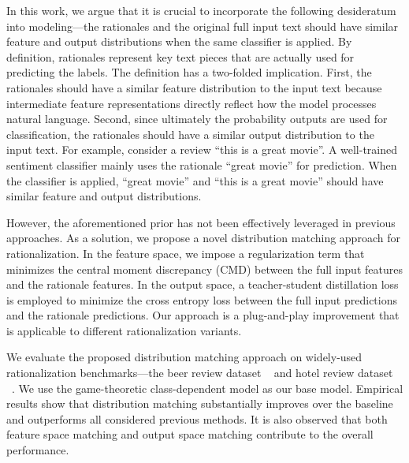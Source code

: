 \documentclass[letterpaper]{article} %
\begin{document}
In this work, we argue that it is crucial to incorporate the following desideratum into modeling---the rationales and the original full input text should have similar feature and output distributions when the same classifier is applied. By definition, rationales represent key text pieces that are actually used for predicting the labels. The definition has a two-folded implication. First, the rationales should have a similar feature distribution to the input text because intermediate feature representations directly reflect how the model processes natural language. Second, since ultimately the probability outputs are used for classification, the rationales should have a similar output distribution to the input text. For example, consider a review ``this is a great movie''. A well-trained sentiment classifier mainly uses the rationale ``great movie'' for prediction. When the classifier is applied, ``great movie'' and ``this is a great movie'' should have similar feature and output distributions.

However, the aforementioned prior has not been effectively leveraged in previous approaches. As a solution, we propose a novel distribution matching approach for rationalization. In the feature space, we impose a regularization term that minimizes the central moment discrepancy (CMD) \cite{Zellinger2017CentralMD} between the full input features and the rationale features. In the output space, a teacher-student distillation loss \cite{hinton2015distilling} is employed to minimize the cross entropy loss between the full input predictions and the rationale predictions. 
Our approach is a plug-and-play improvement that is applicable to different rationalization variants.

We evaluate the proposed distribution matching approach on widely-used rationalization benchmarks---the beer review dataset ~\cite{McAuley2012LearningAA} and hotel review dataset ~\cite{Bao2018DerivingMA}. We use the game-theoretic class-dependent model \cite{chang2019game} as our base model. Empirical results show that distribution matching substantially improves over the baseline and outperforms all considered previous methods. It is also observed that both feature space matching and output space matching contribute to the overall performance.
\end{document}
